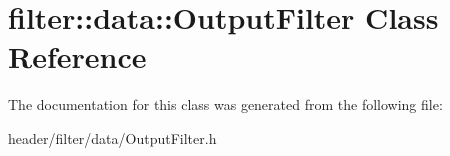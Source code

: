 \hypertarget{classfilter_1_1data_1_1_output_filter}{}\section{filter\+:\+:data\+:\+:Output\+Filter Class Reference}
\label{classfilter_1_1data_1_1_output_filter}


The documentation for this class was generated from the following file\+:\begin{DoxyCompactItemize}
\item 
header/filter/data/Output\+Filter.\+h\end{DoxyCompactItemize}
